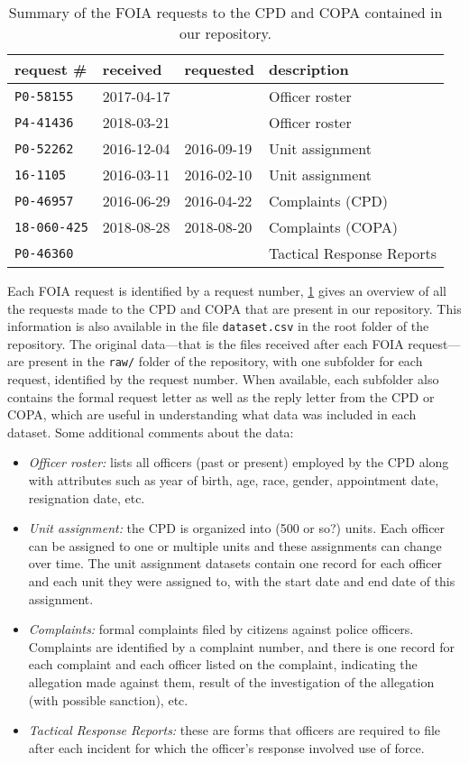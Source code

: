 \begin{table}[h]
	\begin{center}
\begin{tabular}{@{}llll@{}}
	\toprule
	request \#&received&requested&description\\
\midrule
	\texttt{P0-58155}&2017-04-17& &Officer roster\\
	\texttt{P4-41436}&2018-03-21& &Officer roster\\
		\texttt{P0-52262}&2016-12-04&2016-09-19&Unit assignment\\
		\texttt{16-1105}&2016-03-11&2016-02-10&Unit assignment\\
	\texttt{P0-46957}&2016-06-29&2016-04-22&Complaints (CPD)\\
	\texttt{18-060-425}&2018-08-28&2018-08-20&Complaints (COPA)\\
	\texttt{P0-46360}& & &Tactical Response Reports\\
\bottomrule
\end{tabular}
\caption{Summary of the FOIA requests to the CPD and COPA contained in our repository.}
\label{table:summary}
\end{center}
\end{table}

Each FOIA request is identified by a request number, \cref{table:summary} gives
an overview of all the requests made to the CPD and COPA that are present in
our repository. This information is also available in the file
\texttt{dataset.csv} in the root folder of the repository. The original
data—that is the files received after each FOIA request—are present in the
\texttt{raw/} folder of the repository, with one subfolder for each request,
identified by the request number. When available, each subfolder also contains
the formal request letter as well as the reply letter from the CPD or COPA,
which are useful in understanding what data was included in each dataset.
Some additional comments about the data:
\begin{itemize}
	\item \emph{Officer roster:} lists all officers (past or present) employed
		by the CPD along with attributes such as year of birth, age, race,
		gender, appointment date, resignation date, etc.
	\item \emph{Unit assignment:} the CPD is organized into (500 or so?) units.
		Each officer can be assigned to one or multiple units and these
		assignments can change over time. The unit assignment datasets contain
		one record for each officer and each unit they were assigned to, with
		the start date and end date of this assignment.
	\item \emph{Complaints:} formal complaints filed by citizens against police
		officers. Complaints are identified by a complaint number, and there is
		one record for each complaint and each officer listed on the complaint,
		indicating the allegation made against them, result of the
		investigation of the allegation (with possible sanction), etc.
	\item \emph{Tactical Response Reports:} these are forms that officers are
		required to file after each incident for which the officer's response
		involved use of force.
\end{itemize}

